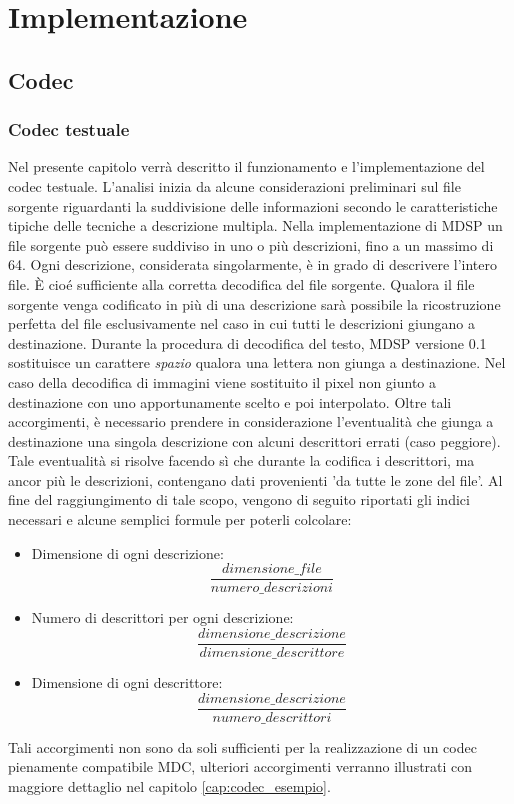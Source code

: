 \chapter{Implementazione}
\section{Codec}
\subsection{Codec testuale}
\label{cap:implementazione_codec}
Nel presente capitolo verrà descritto il funzionamento e l'implementazione
del codec testuale. L'analisi inizia da alcune considerazioni preliminari sul
file sorgente riguardanti la suddivisione delle informazioni secondo le
caratteristiche tipiche delle tecniche a descrizione multipla. Nella
implementazione di MDSP un file sorgente può essere suddiviso in uno o più
descrizioni, fino a un massimo di 64. Ogni descrizione, considerata
singolarmente, è in grado di descrivere l'intero file. \`E cioé sufficiente
alla corretta decodifica del file sorgente. Qualora il file sorgente venga
codificato in più di una descrizione sarà possibile la ricostruzione
perfetta del file esclusivamente nel caso in cui tutti le descrizioni giungano
a destinazione. Durante la procedura di decodifica del testo, MDSP versione 0.1
sostituisce un carattere \emph{spazio} qualora una lettera non giunga a
destinazione. Nel caso della decodifica di immagini viene sostituito il
pixel non giunto a destinazione con uno apportunamente scelto e
poi interpolato. Oltre tali accorgimenti, è necessario prendere in
considerazione l'eventualità che giunga a destinazione una singola descrizione
con alcuni descrittori errati (caso peggiore). Tale eventualità si risolve
facendo sì che durante la codifica i descrittori, ma ancor più le descrizioni,
contengano dati provenienti 'da tutte le zone del file'. Al fine del
raggiungimento di tale scopo, vengono di seguito riportati gli indici necessari
e alcune semplici formule per poterli colcolare:
\begin{itemize}
 \item Dimensione di ogni descrizione: $$\frac{dimensione\_file}{numero\_descrizioni}$$
 \item Numero di descrittori per ogni descrizione: $$\frac{dimensione\_descrizione}{dimensione\_descrittore}$$
 \item Dimensione di ogni descrittore: $$\frac{dimensione\_descrizione}{numero\_descrittori}$$
\end{itemize}
Tali accorgimenti non sono da soli sufficienti per la realizzazione di un codec
pienamente compatibile MDC, ulteriori accorgimenti verranno illustrati con
maggiore dettaglio nel capitolo \ref{cap:codec_esempio}.

